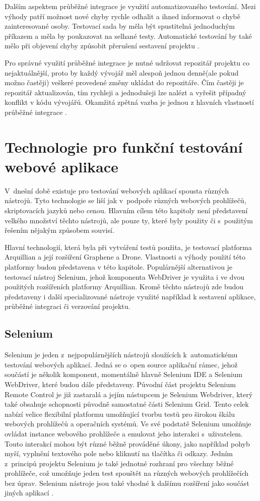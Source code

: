 \documentclass[
    color,   %
	table,   %
    twoside, %
]{fithesis3}
\begin{document}
Dalším aspektem průběžné integrace je využití automatizovaného testování. Mezi výhody patří možnost nové chyby rychle odhalit a ihned informovat o chybě zainteresované osoby. Testovací sada by měla být spustitelná jednoduchým příkazem a měla by poukazovat na selhané testy. Automatické testování by také mělo při objevení chyby způsobit přerušení sestavení projektu \cite{Fowler}.

Pro správné využití průběžné integrace je nutné udržovat repozitář projektu co nejaktuálnější, proto by každý vývojář měl alespoň jednou denně(ale pokud možno častěji) veškeré provedené změny ukládat do repozitáře. Čím častěji je repozitář aktualizován, tím rychleji a jednodušeji lze nalézt a vyřešit případný konflikt v kódu vývojářů. Okamžitá zpětná vazba je jednou z hlavních vlastností průběžné integrace \cite{Fowler}.

\chapter{Technologie pro funkční testování webové aplikace}
V~dnešní době existuje pro testování webových aplikací spousta různých nástrojů. Tyto technologie se liší jak v~podpoře různých webových prohlížečů, skriptovacích jazyků nebo cenou. Hlavním cílem této kapitoly není představení velkého množství těchto nástrojů, ale pouze ty, které byly použity či s~použitým řešením nějakým způsobem souvisí.

Hlavní technologií, která byla při vytváření testů použita, je testovací platforma Arquillian a její rozšíření Graphene a Drone. Vlastnosti a výhody použití této platformy budou představena v této kapitole. Populárnější alternativou je testovací nástroj Selenium, jehož komponenta WebDriver je využita i ve dvou použitých rozšířeních platformy Arquillian. Kromě těchto nástrojů zde budou představeny i další specializované nástroje využité například k sestavení aplikace, průběžné integraci či verzování projektu.

\section{Selenium}
Selenium je jeden z~nejpopulárnějších nástrojů sloužících k~automatickému testování webových aplikací.   Jedná se o~open source aplikační rámec, jehož součástí je několik komponent, momentálně hlavně Selenium IDE a Selenium WebDriver, které budou dále představeny. Původní část projektu Selenium Remote Control je již zastaralá a jejím nástupcem je Selenium Webdriver, který také obsahuje schopnosti původně samostatné části Selenium Grid. Tento celek nabízí velice flexibilní platformu umožňující tvorbu testů pro širokou škálu webových prohlížečů a operačních systémů.
Ve své podstatě Selenium umožňuje ovládat instance webového prohlížeče a emulovat jeho interakci s~uživatelem. Touto interakcí mohou být různé běžně prováděné úkony, jako například pohyb myší, vyplnění textového pole nebo kliknutí na tlačítka či odkazy. Jedním z~principů projektu Selenium je také jednotné rozhraní pro všechny běžné prohlížeče, což umožňuje jeden test spouštět na různých webových prohlížečích bez úprav. Selenium nástroje jsou také vhodné k dalšímu rozšíření jako součást jiných aplikací \cite{SeleniumGithub}.
\end{document}
